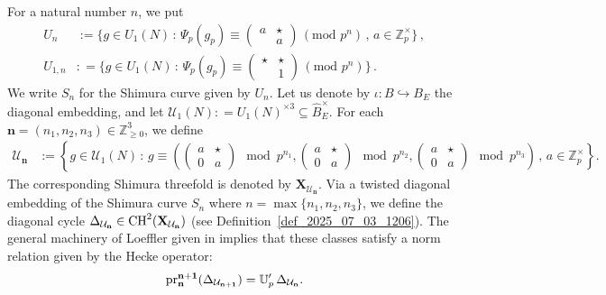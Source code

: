 \documentclass{amsart}
\numberwithin{equation}{section}
\newcommand{\Zp}{\mathbb{Z}_p}
\begin{document}
For a natural number $n$, we put
 \begin{align*}
     U_n &:= \{ g \in U_1(N) \,:\, \Psi_p(g_p) \equiv \left( \begin{smallmatrix} a & \star  \\  & a \end{smallmatrix}\right)\, (\text{mod } p^n)\, ,\,a \in\Zp^\times\}\,, \\
     U_{1,n}& : = \{ g \in  U_1(N)  \,:\, \Psi_p(g_p) \equiv \left( \begin{smallmatrix} \star &  \star \\  & 1 \end{smallmatrix}\right)\, (\text{mod } p^n)\}\,.     
  \end{align*}
  We write $S_n$ for the Shimura curve given by $U_n$.
 Let us denote by $\iota: B \hookrightarrow B_E$ the diagonal embedding, and let $\mathcal{U}_1(N) : = U_1(N)^{\times 3} \subseteq \widehat{B}_E^{\times}$. For each $\mathbf{n}=(n_1,n_2,n_3) \in \mathbb{Z}_{\geq 0}^3$, we define
\begin{align*}
   \mathcal{U}_{\mathbf{n}} &:=\left \{ g \in  \mathcal{U}_{1}(N)\,:\, g \equiv \left(\left( \begin{smallmatrix}  a & \star \\ 0 & a \end{smallmatrix}\right) \mod p^{n_1},\left( \begin{smallmatrix}  a & \star \\ 0 & a \end{smallmatrix}\right) \mod p^{n_2},\left( \begin{smallmatrix} a & \star \\ 0 & a \end{smallmatrix}\right) \mod p^{n_3}\right)\, ,\,a \in\Zp^\times\right\}.
\end{align*}
The corresponding Shimura threefold is denoted by $\mathbf{X}_{\mathcal{U}_{\mathbf{n}}}$. Via a twisted diagonal embedding of the Shimura curve $S_n$ where $n=\max\{n_1,n_2,n_3\}$, we define the diagonal cycle $\Delta_{\mathcal{U}_{\mathbf{n}} } \in {\rm CH}^2(\mathbf{X}_{\mathcal{U}_{\mathbf{n}}})$ (see Definition~\ref{def_2025_07_03_1206}). The general machinery of Loeffler given in \cite{LoefflerSpherical} implies that these classes satisfy a norm relation given by the Hecke operator:
 \[ {\rm pr}^{\mathbf{n}+\mathbf{1}}_{\mathbf{n}}(\Delta_{\mathcal{U}_{\mathbf{n+1}}}) = \mathbb{U}_p' \, \Delta_{\mathcal{U}_{\mathbf{n}}}.\] 
\end{document}
